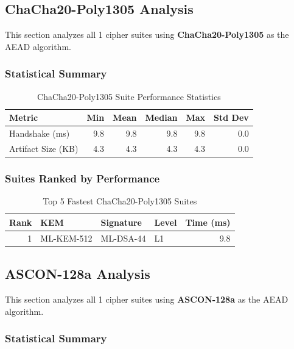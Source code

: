 \documentclass[11pt,a4paper,twoside]{article}
\begin{document}
\subsection{ChaCha20-Poly1305 Analysis}
\label{sec:aead-chacha20poly1305}

This section analyzes all 1 cipher suites using \textbf{ChaCha20-Poly1305} as the AEAD algorithm.

\subsubsection{Statistical Summary}

\begin{table}[H]
\centering
\caption{ChaCha20-Poly1305 Suite Performance Statistics}
\begin{tabular}{l r r r r r}
\toprule
\textbf{Metric} & \textbf{Min} & \textbf{Mean} & \textbf{Median} & \textbf{Max} & \textbf{Std Dev} \\
\midrule
Handshake (ms) & 9.8 & 9.8 & 9.8 & 9.8 & 0.0 \\
Artifact Size (KB) & 4.3 & 4.3 & 4.3 & 4.3 & 0.0 \\
\bottomrule
\end{tabular}
\end{table}

\subsubsection{Suites Ranked by Performance}

\begin{table}[H]
\centering
\caption{Top 5 Fastest ChaCha20-Poly1305 Suites}
\begin{tabular}{r l l l r}
\toprule
\textbf{Rank} & \textbf{KEM} & \textbf{Signature} & \textbf{Level} & \textbf{Time (ms)} \\
\midrule
1 & ML-KEM-512 & ML-DSA-44 & L1 & 9.8 \\
\bottomrule
\end{tabular}
\end{table}

\subsection{ASCON-128a Analysis}
\label{sec:aead-ascon128a}

This section analyzes all 1 cipher suites using \textbf{ASCON-128a} as the AEAD algorithm.

\subsubsection{Statistical Summary}
\end{document}
